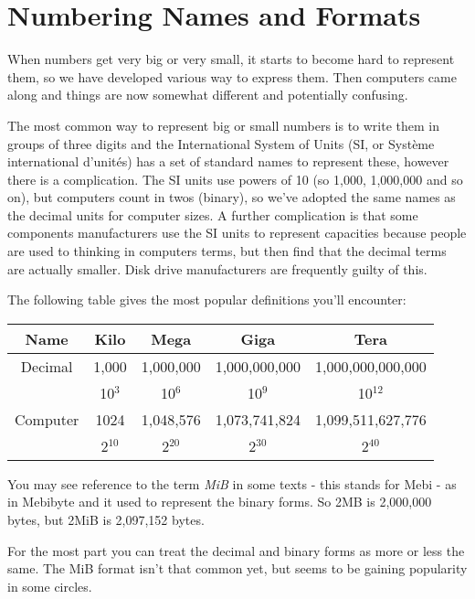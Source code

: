 \chapter{Numbering Names and Formats}
When numbers get very big or very small, it starts to become hard to
represent them, so we have developed various way to express them. Then
computers came along and things are now somewhat different and potentially
confusing.

The most common way to represent big or small numbers is to write them
in groups of three digits and the International System of Units (SI,
or Syst\`{e}me international d'unit\'{e}s) has a set of standard names
to represent these, however there is a complication. The SI units use
powers of 10 (so 1,000, 1,000,000 and so on), but computers count in
twos (binary), so we've adopted the same names as the decimal units
for computer sizes. A further complication is that some components
manufacturers use the SI units to represent capacities because people
are used to thinking in computers terms, but then find that the decimal
terms are actually smaller. Disk drive manufacturers are frequently
guilty  of this.

The following table gives the most popular definitions you'll encounter:

\begin{tabular}[t]{|c|c|c|c|c|}
\hline
Name	& Kilo		& Mega		& Giga		& Tera			\\
\hline
Decimal	& 1,000		& 1,000,000	& 1,000,000,000	& 1,000,000,000,000	\\
\hline
	& 10$^3$	& 10$^6$	& 10$^9$	& 10$^{12}$		\\
\hline
\hline
Computer& 1024		& 1,048,576	& 1,073,741,824 & 1,099,511,627,776	\\
\hline
	& 2$^{10}$	& 2$^{20}$	& 2$^{30}$	& 2$^{40}$		\\
\hline
\end{tabular}

\noindent
You may see reference to the term {\sl MiB} in some texts - this stands
for Mebi - as in Mebibyte and it used to represent the binary forms. So
2MB is 2,000,000 bytes, but 2MiB is 2,097,152 bytes.

For the most part you can treat the decimal and binary forms as more or
less the same. The MiB format isn't that common yet, but seems to be gaining
popularity in some circles.
